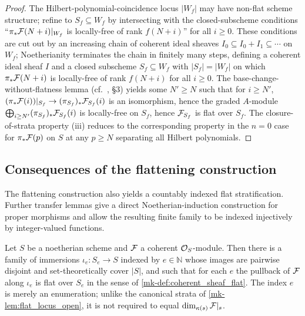 \begin{proof}
  The Hilbert-polynomial-coincidence locus \(|W_f|\) may have non-flat scheme
  structure; refine to \(S_f \subseteq W_f\) by intersecting with the
  closed-subscheme conditions ``\(\pi_* \mathcal{F}(N+i)|_{W_f}\) is locally-free of rank
  \(f(N+i)\)'' for all \(i \ge 0\).  These conditions are cut out by an increasing
  chain of coherent ideal sheaves \(I_0 \subseteq I_0 + I_1 \subseteq \cdots\) on
  \(W_f\); Noetherianity terminates the chain in finitely many steps, defining a
  coherent ideal sheaf \(I\) and a closed subscheme \(S_f \subseteq W_f\) with
  \(|S_f| = |W_f|\) on which \(\pi_* \mathcal{F}(N+i)\) is locally-free of rank \(f(N+i)\)
  for all \(i \ge 0\). The base-change-without-flatness lemma (cf.\ \cite{nitsure-hilbert-quot},
  \S3) yields some \(N' \ge N\) such that for \(i \ge N'\),
  \((\pi_* \mathcal{F}(i))|_{S_f} \to (\pi_{S_f})_* \mathcal{F}_{S_f}(i)\) is an isomorphism, hence
  the graded \(A\)-module \(\bigoplus_{i \ge N'} (\pi_{S_f})_* \mathcal{F}_{S_f}(i)\) is
  locally-free on \(S_f\), hence \(\mathcal{F}_{S_f}\) is flat over \(S_f\). The
  closure-of-strata property (iii) reduces to the corresponding property in
  the \(n=0\) case for \(\pi_* \mathcal{F}(p)\) on \(S\) at any \(p \ge N\) separating all
  Hilbert polynomials.
\end{proof}

\subsection{Consequences of the flattening construction}
The flattening construction also yields a countably indexed flat
stratification.  Further transfer lemmas give a direct Noetherian-induction
construction for proper morphisms and allow the resulting finite family to
be indexed injectively by integer-valued functions.

\begin{lemma}[Flat-locus stratification, special case \(n = 0\)]\label{mk-lem:flat_locus_stratification_lean}
  \leanok

  Let \(S\) be a noetherian scheme and \(\mathcal{F}\) a coherent \(\mathcal{O}_S\)-module.
  Then there is a family of immersions \(\iota_e : S_e \to S\) indexed by
  \(e \in \mathbb{N}\) whose images are pairwise disjoint and set-theoretically
  cover \(|S|\), and such that for each \(e\) the pullback of \(\mathcal{F}\) along
  \(\iota_e\) is flat over \(S_e\) in the sense of
  \ref{mk-def:coherent_sheaf_flat}.  The index \(e\) is merely an enumeration;
  unlike the canonical strata of \ref{mk-lem:flat_locus_open}, it is not
  required to equal \(\dim_{\kappa(s)} \mathcal{F}|_s\).
\end{lemma}


